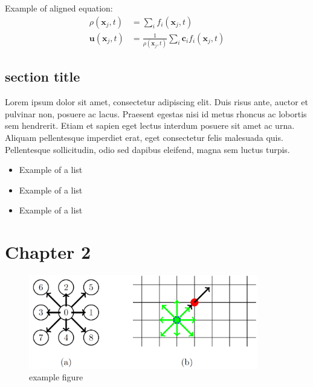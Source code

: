 \documentclass[a4paper,11pt]{report}
\begin{document}
    Example of aligned equation:
    \begin{align}
        \rho(\mathbf{x}_j, t) &= \sum_i f_i(\mathbf{x}_j, t) \\
        \mathbf{u}(\mathbf{x}_j, t) &= \frac{1}{ \rho(\mathbf{x}_j, t)}
        \sum_i \mathbf{c}_i f_i(\mathbf{x}_j, t)
    \end{align}


    \section{section title}
    Lorem ipsum dolor sit amet, consectetur adipiscing elit. Duis risus ante, auctor et pulvinar non, posuere ac lacus. Praesent egestas nisi id metus rhoncus ac lobortis sem hendrerit. Etiam et sapien eget lectus interdum posuere sit amet ac urna. Aliquam pellentesque imperdiet erat, eget consectetur felis malesuada quis. Pellentesque sollicitudin, odio sed dapibus eleifend, magna sem luctus turpis.

    \begin{itemize}
        \item Example of a list
        \item Example of a list
        \item Example of a list
    \end{itemize}


    \chapter{Chapter 2}

    \begin{figure}[H]
        \begin{center}
            \includegraphics[width=10cm]{logos/Gitter_LBM.png}
            \caption{example figure}
            \label{fig:mesh}
        \end{center}
    \end{figure}
\end{document}
